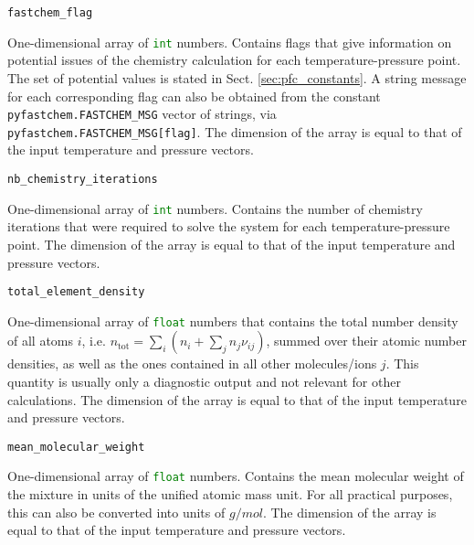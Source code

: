 \documentclass[numbers=noenddot]{fcmanual}
\begin{document}
\bigbreak

\lstinline!fastchem_flag!
\begin{addmargin}[25pt]{0pt}
	One-dimensional array of \lstinline[language=Python]!int! numbers. Contains flags that give information on potential issues of the chemistry calculation for each temperature-pressure point. The set of potential values is stated in Sect. \ref{sec:pfc_constants}. A string message for each corresponding flag can also be obtained from the constant \lstinline!pyfastchem.FASTCHEM_MSG! vector of strings, via \lstinline!pyfastchem.FASTCHEM_MSG[flag]!. The dimension of the array is equal to that of the input temperature and pressure vectors.
\end{addmargin}

\bigbreak

\lstinline!nb_chemistry_iterations!
\begin{addmargin}[25pt]{0pt}
	One-dimensional array of \lstinline[language=Python]!int! numbers. Contains the number of chemistry iterations that were required to solve the system for each temperature-pressure point. The dimension of the array is equal to that of the input temperature and pressure vectors.
\end{addmargin}

\bigbreak

\lstinline!total_element_density!
\begin{addmargin}[25pt]{0pt}
	One-dimensional array of \lstinline[language=Python]!float! numbers that contains the total number density of all atoms $i$, i.e. $n_\mathrm{tot} = \sum_i \left( n_i + \sum_j n_j \nu_{ij} \right)$, summed over their atomic number densities, as well as the ones contained in all other molecules/ions $j$. This quantity is usually only a diagnostic output and not relevant for other calculations. The dimension of the array is equal to that of the input temperature and pressure vectors.
\end{addmargin}

\bigbreak

\lstinline!mean_molecular_weight!
\begin{addmargin}[25pt]{0pt}
	One-dimensional array of \lstinline[language=Python]!float! numbers. Contains the mean molecular weight of the mixture in units of the unified atomic mass unit. For all practical purposes, this can also be converted into units of $\unit{g/mol}$. The dimension of the array is equal to that of the input temperature and pressure vectors.
\end{addmargin}
\end{document}
